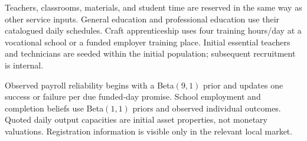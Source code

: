 \documentclass[10pt,a4paper,twocolumn]{article}
\begin{document}
Teachers, classrooms, materials, and student time are reserved in the
same way as other service inputs. General education and professional
education use their catalogued daily schedules. Craft apprenticeship
uses four training hours/day at a vocational school or a funded employer
training place. Initial essential teachers and technicians are seeded
within the initial population; subsequent recruitment is internal.

Observed payroll reliability begins with a Beta$(9,1)$ prior and updates
one success or failure per due funded-day promise. School employment and
completion beliefs use Beta$(1,1)$ priors and observed individual
outcomes. Quoted daily output capacities are initial asset properties,
not monetary valuations. Registration information is visible only in
the relevant local market.
\end{document}
